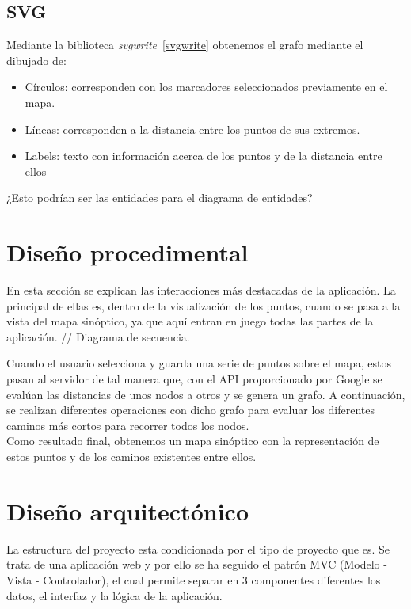 \subsection{SVG}
Mediante la biblioteca \textit{svgwrite}~\ref{svgwrite} obtenemos el grafo mediante el dibujado de:
\begin{itemize}
	\item Círculos: corresponden con los marcadores seleccionados previamente en el mapa.
	\item Líneas: corresponden a la distancia entre los puntos de sus extremos.
	\item Labels: texto con información acerca de los puntos y de la distancia entre ellos
\end{itemize}

¿Esto podrían ser las entidades para el diagrama de entidades?

\section{Diseño procedimental}
En esta sección se explican las interacciones más destacadas de la aplicación. La principal de ellas es, dentro de la visualización de los puntos, cuando se pasa a la vista del mapa sinóptico, ya que aquí entran en juego todas las partes de la aplicación.
// Diagrama de secuencia.


Cuando el usuario selecciona y guarda una serie de puntos sobre el mapa, estos pasan al servidor de tal manera que, con el API proporcionado por Google se evalúan las distancias de unos nodos a otros y se genera un grafo. A continuación, se realizan diferentes operaciones con dicho grafo para evaluar los diferentes caminos más cortos para recorrer todos los nodos. \\
Como resultado final, obtenemos un mapa sinóptico con la representación de estos puntos y de los caminos existentes entre ellos.


\section{Diseño arquitectónico}

La estructura del proyecto esta condicionada por el tipo de proyecto que es. Se trata de una aplicación web y por ello se ha seguido el patrón MVC (Modelo - Vista - Controlador), el cual permite separar en 3 componentes diferentes los datos, el interfaz y la lógica de la aplicación. 

